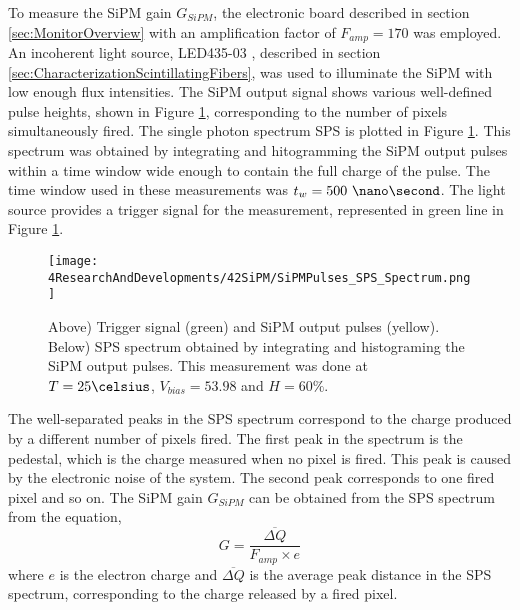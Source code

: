 To measure the SiPM gain $G_{SiPM}$, the electronic board described in section \ref{sec:MonitorOverview} with an amplification factor of $F_{amp}=170$ was employed. An incoherent light source, LED435-03 \cite{LEDRLT}, described in section \ref{sec:CharacterizationScintillatingFibers}, was used to illuminate the SiPM with low enough flux intensities. The SiPM output signal shows various well-defined pulse heights, shown in Figure \ref{fig:OutputPulses_SPSspectrum}, corresponding to the number of pixels simultaneously fired. The single photon spectrum SPS is plotted in Figure \ref{fig:OutputPulses_SPSspectrum}. This spectrum was obtained by integrating and hitogramming the SiPM output pulses within a time window wide enough to contain the full charge of the pulse. The time window used in these measurements was $t_w= 500~\nano\second$. The light source provides a trigger signal for the measurement, represented in green line in Figure \ref{fig:OutputPulses_SPSspectrum}.
\begin{figure}[hbtp]
\centering
\texttt{[image: 4ResearchAndDevelopments/42SiPM/SiPMPulses\_SPS\_Spectrum.png]}
\caption{Above) Trigger signal (green) and SiPM output pulses (yellow). Below) SPS spectrum obtained by integrating and histograming the SiPM output pulses. This measurement was done at $T=25\celsius$, $V_{bias}=53.98$ and $H=60\%$. \label{fig:OutputPulses_SPSspectrum}}
\end{figure}
The well-separated peaks in the SPS spectrum correspond to the charge produced by a different number of pixels fired. The first peak in the spectrum is the pedestal, which is the charge measured when no pixel is fired. This peak is caused by the electronic noise of the system. The second peak corresponds to one fired pixel and so on. The SiPM gain $G_{SiPM}$ can be obtained from the SPS spectrum from the equation,
\begin{equation}
G=\frac{\overline{\Delta Q}}{F_{amp} \times e}
\label{SiPMGain}
\end{equation}
where $e$ is the electron charge and $\overline{\Delta Q}$ is the average peak distance in the SPS spectrum, corresponding to the charge released by a fired pixel. 


